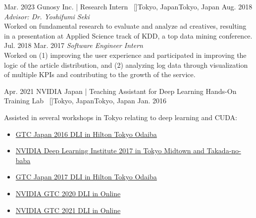\begin{experiences}
    \emptySeparator
    \researchexperience
    {Mar. 2023}   {Gunosy Inc. | Research Intern{\normalfont  ~ [\href{https://gunosy.co.jp/en/}{\small{\websiteSymbol}}]}}{Tokyo, Japan}{Tokyo, Japan}
    {Aug. 2018} {\textit{Advisor: Dr. Yoshifumi Seki}\\
    Worked on fundamental research to evaluate and analyze ad creatives, resulting in a presentation at Applied Science track of KDD, a top data mining conference.
    \vskip 0.1cm
    }
    \researchexperience
    {Jul. 2018}   {}{}{}
    {Mar. 2017} {\textit{Software Engineer Intern}\\
        Worked on (1) improving the user experience and participated in improving the logic of the article distribution, and (2) analyzing log data through visualization of multiple KPIs and contributing to the growth of the service.
    }


    \emptySeparator
    \researchexperience
    {Apr. 2021}   {NVIDIA Japan | Teaching Assistant for Deep Learning Hands-On Training Lab{\normalfont  ~ [\href{https://www.nvidia.com/ja-jp/}{\small{\websiteSymbol}}]}}{Tokyo, Japan}{Tokyo, Japan}
    {Jan. 2016} {
    Assisted in several workshops in Tokyo relating to deep learning and CUDA:
    \begin{itemize}
        \item \href{https://nvidia.connpass.com/event/39743/}{GTC Japan 2016 DLI in Hilton Tokyo Odaiba}
        \item \href{https://nvidia.connpass.com/event/54780/}{NVIDIA Deep Learning Institute 2017 in Tokyo Midtown and Takada-no-baba}
        \item \href{https://nvidia.connpass.com/event/68912/}{GTC Japan 2017 DLI in Hilton Tokyo Odaiba}
        \item \href{https://nvidia.connpass.com/event/189637/}{NVIDIA GTC 2020 DLI in Online}
        \item \href{https://nvidia.connpass.com/event/208506/}{NVIDIA GTC 2021 DLI in Online}
    \end{itemize}
    }



\end{experiences}
